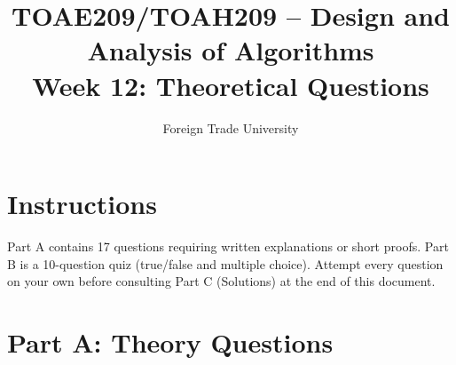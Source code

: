 \documentclass[11pt]{article}
\title{TOAE209/TOAH209 -- Design and Analysis of Algorithms\\[4pt]
\large Week 12: Theoretical Questions}
\author{Foreign Trade University}
\date{}
\begin{document}
\maketitle

\section*{Instructions}

Part A contains 17 questions requiring written explanations or short proofs. Part B is a
10-question quiz (true/false and multiple choice). Attempt every question on your own
before consulting Part C (Solutions) at the end of this document.

\section*{Part A: Theory Questions}
\end{document}
